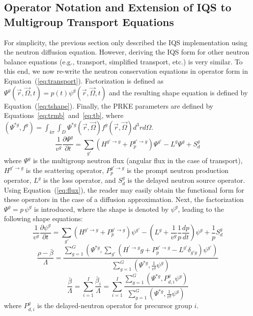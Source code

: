 \documentclass[12pt]{scrartcl}
\newcommand{\eqt}[1]{Equation~(\ref{#1})}                     %
\newcommand{\be}{\begin{equation}}
\newcommand{\ee}{\end{equation}}
\begin{document}
\subsection{Operator Notation and Extension of IQS to Multigroup Transport Equations}
\label{sect:transport}

For simplicity, the previous section only described the IQS implementation using the neutron diffusion equation. However, deriving the IQS form for other neutron balance equations (e.g., transport, simplified transport, etc.) is very similar. To this end, we now re-write the neutron conservation equations in operator form in \eqt{eq:transport}.  Factorization is defined as $\Psi^g(\vec{r},\vec{\Omega},t)=p(t)\psi^g(\vec{r},\vec{\Omega},t)$ and the resulting shape equation is defined by \eqt{eq:tshape}.  Finally, the PRKE parameters are defined by Equations~\ref{eq:trmb}~and~\ref{eq:tb}, where $\left(\Psi^{*g},f^g\right) = \int_{4\pi}\int_D \Psi^{*g}(\vec{r},\vec{\Omega})f^g(\vec{r},\vec{\Omega})d^3r d\Omega$.
\be
\frac{1}{v^g}\frac{\partial \Psi^g}{\partial t} = \sum_{g'} \left(H^{g'\to g} + P_p^{g' \to g} \right) \Psi^{g'} - L^g\Psi^g + S_d^g
\label{eq:transport}
\ee
where $\Psi^g$ is the multigroup neutron flux (angular flux in the case of transport), $H^{g'\to g}$ is the scattering operator, $P_p^{g' \to g}$ is the prompt neutron production operator, $L^g$ is the loss operator, and $S_d^g$ is the delayed neutron source operator. Using \eqt{eq:flux}, the reader may easily obtain the functional form for these operators in the case of a diffusion approximation. Next, the factorization $\Psi^g = p \, \psi^g$ is introduced, where the shape is denoted by $\psi^g$, leading to the following shape equations:
\be
\frac{1}{v^g}\frac{\partial \psi^g}{\partial t} = \sum_{g'} \left(H^{g' \to g} + P_p^{g' \to g}\right) \psi^{g'} - \left( L^g + \frac{1}{v^g}\frac{1}{p}\frac{dp}{dt}\right) \psi^g + \frac{1}{p} S_d^g
\label{eq:tshape}
\ee
\be
\frac{\rho-\bar{\beta}}{\Lambda}=\frac{ \sum_{g=1}^G\left(\Psi^{*g},\sum_{g'}(H^{' \to g}g+P_p^{g' \to g}-L^{g'}\delta_{g'g})\psi^{g'}\right)}{\sum_{g=1}^G\left(\Psi^{*g},\frac{1}{v^g}\psi^g\right)}
\label{eq:trmb}
\ee
\be
\frac{\bar{\beta}}{\Lambda}=\sum_{i=1}^I\frac{\bar{\beta}_i}{\Lambda}=\sum_{i=1}^I\frac{\sum_{g=1}^G(\Psi^{*g}, P_{d,i}^g \psi^g)}{\sum_{g=1}^G\left(\Psi^{*g},\frac{1}{v^g}\psi^g\right)}
\label{eq:tb}
\ee
where $P_{d,i}^g$ is the delayed-neutron operator for precursor group $i$.
\end{document}
